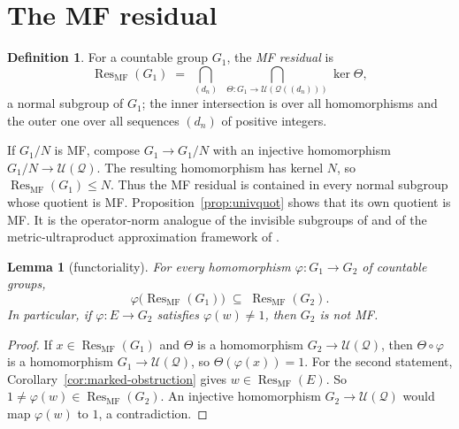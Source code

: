 \documentclass[11pt]{amsart}
\newcommand{\leanverified}[2]{\ignorespaces}
\newtheorem{lemma}[theorem]{Lemma}
\theoremstyle{definition}
\newtheorem{definition}[theorem]{Definition}
\theoremstyle{remark}
\theoremstyle{plain}
\newcommand{\U}{\mathcal U}
\begin{document}
\section{The MF residual}\label{sec:consequences}

\begin{definition}\label{def:radical}
For a countable group $G_1$, the \emph{MF residual} is
\[
  \operatorname{Res}_{\mathrm{MF}}(G_1)
  \;=\;\bigcap_{(d_n)}\ \,\bigcap_{\Theta\colon G_1\to\U(\mathcal Q((d_n)))}\ker\Theta,
\]
a normal subgroup of $G_1$; the inner intersection is over all
homomorphisms and the outer one over all sequences $(d_n)$ of positive
integers.
\leanverified{Sofic/ManuscriptExactWrappers}{GroupApproximation.ManuscriptExactWrappers.manuscriptMFRadical}
\end{definition}

If $G_1/N$ is MF, compose $G_1\to G_1/N$ with an injective homomorphism
$G_1/N\to\U(\mathcal Q)$.  The resulting homomorphism has kernel $N$,
so $\operatorname{Res}_{\mathrm{MF}}(G_1)\le N$.  Thus the MF residual
is contained in every normal subgroup whose quotient is MF\@.
Proposition~\ref{prop:univquot} shows that its own quotient is MF\@.
It is the operator-norm analogue of the invisible subgroups
of \cite[Definitions~2.5--2.7]{SlofstraCorrelations} and of the
metric-ultraproduct approximation framework of \cite{NST}.

\begin{lemma}[functoriality]\label{lem:portable}
For every homomorphism $\varphi\colon G_1\to G_2$ of countable
groups,
\[
  \varphi\bigl(\operatorname{Res}_{\mathrm{MF}}(G_1)\bigr)
  \;\subseteq\;\operatorname{Res}_{\mathrm{MF}}(G_2).
\]
In particular, if
$\varphi\colon E\to G_2$ satisfies $\varphi(w)\neq1$, then $G_2$ is
not MF\@.
\leanverified{Sofic/ManuscriptExactWrappers}{GroupApproximation.ManuscriptExactWrappers.manuscriptRadicalPortability}
\end{lemma}

\begin{proof}
If $x\in\operatorname{Res}_{\mathrm{MF}}(G_1)$ and $\Theta$ is a
homomorphism $G_2\to\U(\mathcal Q)$, then $\Theta\circ\varphi$ is a homomorphism $G_1\to\U(\mathcal Q)$, so $\Theta(\varphi(x))=1$.  For
the second statement, Corollary~\ref{cor:marked-obstruction} gives
$w\in\operatorname{Res}_{\mathrm{MF}}(E)$.  So
$1\neq\varphi(w)\in\operatorname{Res}_{\mathrm{MF}}(G_2)$.  An
injective homomorphism $G_2\to\U(\mathcal Q)$ would map $\varphi(w)$
to $1$, a contradiction.
\end{proof}
\end{document}
